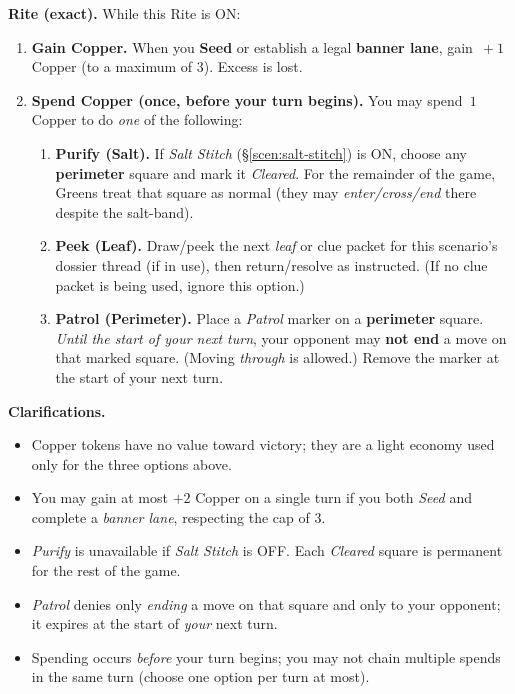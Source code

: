 \documentclass[11pt]{article}
\begin{document}
\medskip
\noindent\textbf{Rite (exact).} While this Rite is \textsc{ON}:
\begin{enumerate}\setlength\itemsep{0.2em}
  \item \textbf{Gain Copper.} When you \textbf{Seed} or establish a legal \textbf{banner lane}, gain \(\,+1\) Copper (to a maximum of 3). Excess is lost.
  \item \textbf{Spend Copper (once, before your turn begins).} You may spend \(\,1\) Copper to do \emph{one} of the following:
  \begin{enumerate}\setlength\itemsep{0.2em}
    \item \textbf{Purify (Salt).} If \emph{Salt Stitch} (\S\ref{scen:salt-stitch}) is \textsc{ON}, choose any \textbf{perimeter} square and mark it \emph{Cleared}. For the remainder of the game, Greens treat that square as normal (they may \emph{enter/cross/end} there despite the salt-band). 
    \item \textbf{Peek (Leaf).} Draw/peek the next \emph{leaf} or clue packet for this scenario’s dossier thread (if in use), then return/resolve as instructed. (If no clue packet is being used, ignore this option.)
    \item \textbf{Patrol (Perimeter).} Place a \emph{Patrol} marker on a \textbf{perimeter} square. \textit{Until the start of your next turn}, your opponent may \textbf{not end} a move on that marked square. (Moving \emph{through} is allowed.) Remove the marker at the start of your next turn.
  \end{enumerate}
\end{enumerate}

\medskip
\noindent\textbf{Clarifications.}
\begin{itemize}\setlength\itemsep{0.25em}
  \item Copper tokens have no value toward victory; they are a light economy used only for the three options above.
  \item You may gain at most \(+2\) Copper on a single turn if you both \emph{Seed} and complete a \emph{banner lane}, respecting the cap of 3.
  \item \textit{Purify} is unavailable if \emph{Salt Stitch} is \textsc{OFF}. Each \emph{Cleared} square is permanent for the rest of the game.
  \item \textit{Patrol} denies only \emph{ending} a move on that square and only to your opponent; it expires at the start of \emph{your} next turn.
  \item Spending occurs \emph{before} your turn begins; you may not chain multiple spends in the same turn (choose one option per turn at most).
\end{itemize}
\end{document}
